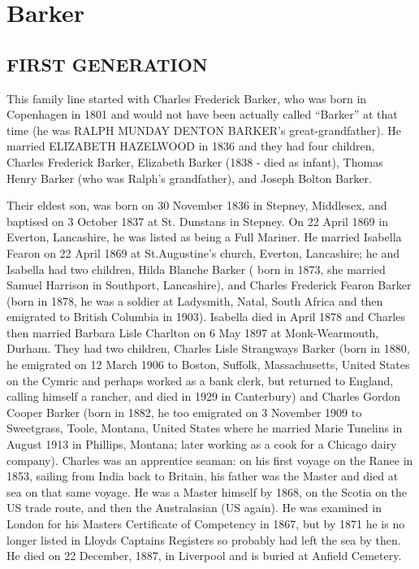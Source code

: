 \section{Barker}

\subsection{FIRST GENERATION}

This family line started with Charles Frederick Barker, who was born in Copenhagen in 1801 and would not have been actually called ``Barker'' at that time (he was \uppercase{Ralph Munday Denton Barker}'s great-grandfather). He married  \uppercase{Elizabeth Hazelwood} in 1836 and they had four children,  Charles Frederick Barker, Elizabeth Barker (1838 - died as infant), Thomas Henry Barker (who was Ralph's grandfather), and Joseph Bolton Barker.

Their eldest son,   was born on 30 November 1836 in Stepney, Middlesex, and baptised on 3 October 1837 at St. Dunstans in Stepney. On 22 April 1869 in Everton, Lancashire, he was listed as being a Full Mariner. He married Isabella Fearon on 22 April 1869 at St.Augustine's church,	Everton, Lancashire; he and Isabella had two children, Hilda Blanche Barker ( born in 1873, she married Samuel Harrison in Southport, Lancashire), and Charles Frederick Fearon Barker (born in 1878, he was a soldier at Ladysmith, Natal, South Africa and then emigrated to British Columbia in 1903). Isabella died in April 1878 and Charles then married Barbara Lisle Charlton on 6 May 1897 at Monk-Wearmouth, Durham. They had two children, Charles Lisle Strangways Barker (born in 1880, he emigrated on 12 March 1906 to	Boston, Suffolk, Massachusetts, United States on the Cymric and perhaps worked as a bank clerk, but returned to England, calling himself a rancher, and died in 1929 in Canterbury) and Charles Gordon Cooper Barker (born in 1882, he too emigrated on 3 November 1909 to	Sweetgrass, Toole, Montana, United States where he married Marie Tunelins in August 1913 in Phillips, Montana; later working as a cook for a Chicago dairy company).
Charles was an apprentice seaman: on his first voyage on the Ranee in 1853, sailing from India back to Britain, his father was the Master and died at sea on that same voyage. He was a Master himself by 1868, on the Scotia on the US trade route, and then the Australasian (US again). He was examined in London for his Masters Certificate of Competency in 1867, but by 1871 he is no longer listed in Lloyds Captains Registers so probably had left the sea by then. He died on 22 December, 1887,  in Liverpool and is buried at Anfield Cemetery.

